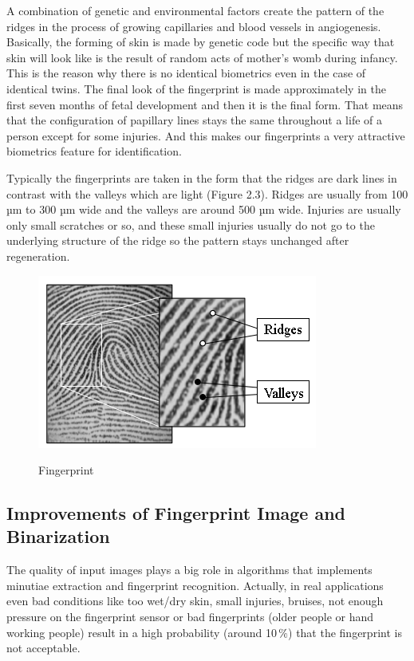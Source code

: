 A combination of genetic and environmental factors create the pattern of the ridges in the process of growing capillaries and blood vessels in angiogenesis. Basically, the forming of skin is made by genetic code but the specific way that skin will look like is the result of random acts of mother’s womb during infancy. This is the reason why there is no identical biometrics even in the case of identical twins. The final look of the fingerprint is made approximately in the first seven months of fetal development and then it is the final form. That means that the configuration of papillary lines stays the same throughout a life of a person except for some injuries. And this makes our fingerprints a very attractive biometrics feature for identification. \cite{maltoni2009handbook} \cite{holder2011fingerprint} \cite{babler1991embryologic}

Typically the fingerprints are taken in the form that the ridges are dark lines in contrast with the valleys which are light (Figure 2.3). Ridges are usually from 100 µm to 300 µm wide and the valleys are around 500 µm wide. Injuries are usually only small scratches or so, and these small injuries usually do not go to the underlying structure of the ridge so the pattern stays unchanged after regeneration. \cite{maltoni2009handbook} \cite{holder2011fingerprint}

\begin{figure}[H]
    \centering
        {\includegraphics[width=0.5\linewidth]{obrazky-figures/print.png}}\\
        \caption{Fingerprint \cite{maltoni2009handbook}}
        \label{fig:fingerprint_1}
\end{figure}

\subsection{Improvements of Fingerprint Image and Binarization}
The quality of input images plays a big role in algorithms that implements minutiae extraction and fingerprint recognition. Actually, in real applications even bad conditions like too wet/dry skin, small injuries, bruises, not enough pressure on the fingerprint sensor or bad fingerprints (older people or hand working people) result in a high probability (around 10\,$\%$) that the fingerprint is not acceptable. \cite{improvement}

